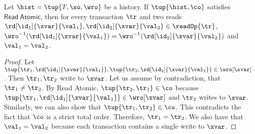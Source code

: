 

\begin{lemma}
 Let $\hist=\tup{T, \so, \wro}$ be a history. 
 If $\tup{\hist,\co}$ satisfies $\mathsf{Read\ Atomic}$, then %
 for every transaction $\tr$ and two reads $\rd[\id_1]{\xvar}{\val_1},\rd[\id_2]{\xvar}{\val_2}\in \readOp{\tr}$, $\wro^{-1}(\rd[\id_1]{\xvar}{\val_1})=\wro^{-1}(\rd[\id_2]{\xvar}{\val_2})$ and $\val_1 = \val_2$.\end{lemma}
\begin{proof}
 Let $\tup{\tr_1, \rd[\id_1]{\xvar}{\val_1}}, \tup{\tr_2, \rd[\id_2]{\xvar}{\val_2}} \in \wro[\xvar]$. Then $\tr_1, \tr_2$ write to $\xvar$. Let us assume by contradiction, that $\tr_1\neq\tr_2$. By \textsf{Read Atomic}, $\tup{\tr_2, \tr_1} \in \co$ because $\tup{\tr_1, \rd[\id_1]{\xvar}{\val_1}} \in \wro[\xvar]$ and $\tr_2$ writes to $\xvar$. Similarly, we can also show that $\tup{\tr_1, \tr_2} \in \co$. This contradicts the fact that $\co$ is a strict total order. Therefore, $\tr_1 = \tr_2$. We also have that $\val_1 = \val_2$ because each transaction contains a single write to $\xvar$.
 \end{proof}

